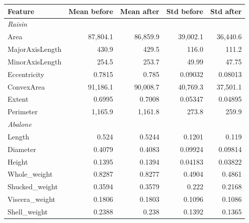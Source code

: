 \begin{tabular}{lrrrr}
\toprule
Feature & Mean before & Mean after & Std before & Std after \\
\midrule
\multicolumn{5}{l}{\textit{Raisin}} \\
Area & 87,804.1 & 86,859.9 & 39,002.1 & 36,440.6 \\
MajorAxisLength & 430.9 & 429.5 & 116.0 & 111.2 \\
MinorAxisLength & 254.5 & 253.7 & 49.99 & 47.75 \\
Eccentricity & 0.7815 & 0.785 & 0.09032 & 0.08013 \\
ConvexArea & 91,186.1 & 90,008.7 & 40,769.3 & 37,501.1 \\
Extent & 0.6995 & 0.7008 & 0.05347 & 0.04895 \\
Perimeter & 1,165.9 & 1,161.8 & 273.8 & 259.9 \\
\multicolumn{5}{l}{\textit{Abalone}} \\
Length & 0.524 & 0.5244 & 0.1201 & 0.119 \\
Diameter & 0.4079 & 0.4083 & 0.09924 & 0.09814 \\
Height & 0.1395 & 0.1394 & 0.04183 & 0.03822 \\
Whole\_weight & 0.8287 & 0.8277 & 0.4904 & 0.4861 \\
Shucked\_weight & 0.3594 & 0.3579 & 0.222 & 0.2168 \\
Viscera\_weight & 0.1806 & 0.1803 & 0.1096 & 0.1086 \\
Shell\_weight & 0.2388 & 0.238 & 0.1392 & 0.1365 \\
\bottomrule
\end{tabular}
